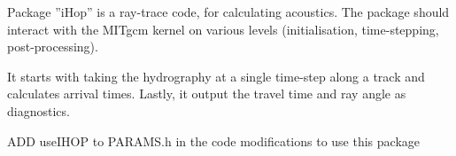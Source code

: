 
Package ''iHop'' is a ray-trace code, for calculating acoustics.
The package should interact with the MITgcm kernel on various levels 
(initialisation, time-stepping, post-processing).

It starts with taking the hydrography at a single time-step along a track and 
calculates arrival times. Lastly, it output the travel time and ray angle as
diagnostics.


ADD useIHOP to PARAMS.h in the code modifications to use this package
